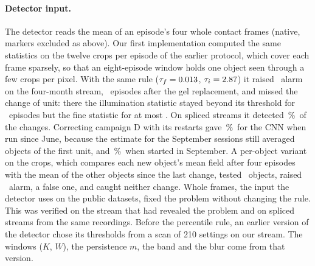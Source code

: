 \documentclass[10pt,twocolumn,letterpaper]{article}
\newcommand{\pct}{\,\%}
\begin{document}
\paragraph{Detector input.} The detector reads the mean of an episode's four whole contact frames (native, markers excluded as above). Our first implementation computed the same statistics on the twelve crops per episode of the earlier protocol, which cover each frame sparsely, so that an eight-episode window holds one object seen through a few crops per pixel. With the same rule ($\tau_f=0.013$, $\tau_i=2.87$) it raised \TrkAlarms\ alarm on the four-month stream, \TrkGelLatency\ episodes after the gel replacement, and missed the change of unit: there the illumination statistic stayed beyond its threshold for \TrkUnitIllumRun\ episodes but the fine statistic for at most \TrkUnitFineRun. On spliced streams it detected \TeOursDet\pct\ of the changes. Correcting campaign D with its restarts gave \SrcSupTrkAcc\pct\ for the CNN when run since June, because the estimate for the September sessions still averaged objects of the first unit, and \SrcSupTrkDepAcc\pct\ when started in September. A per-object variant on the crops, which compares each new object's mean field after four episodes with the mean of the other objects since the last change, tested \ObjTested\ objects, raised \ObjAlarms\ alarm, a false one, and caught neither change. Whole frames, the input the detector uses on the public datasets, fixed the problem without changing the rule. This was verified on the stream that had revealed the problem and on spliced streams from the same recordings. Before the percentile rule, an earlier version of the detector chose its thresholds from a scan of 210 settings on our stream. The windows ($K$, $W$), the persistence $m$, the band and the blur come from that version.
\end{document}

